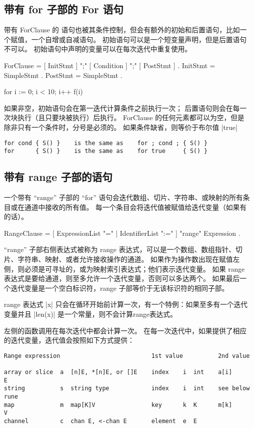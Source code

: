 \subsection{带有 for 子部的 For 语句}
带有 ForClause 的  语句也被其条件控制，但会有额外的初始和后置语句，比如一个赋值，一个自增或自减语句。
初始语句可以是一个短变量声明，但是后置语句不可以。
初始语句中声明的变量可以在每次迭代中重复使用。
\begin{EBNF}
ForClause = [ InitStmt ] ";" [ Condition ] ";" [ PostStmt ] .
InitStmt = SimpleStmt .
PostStmt = SimpleStmt .
\end{EBNF}




\begin{golang}
for i := 0; i < 10; i++ {
	f(i)
}
\end{golang}

如果非空，初始语句会在第一迭代计算条件之前执行一次；
后置语句则会在每一次块执行（且只要块被执行）后执行。
ForClause 的任何元素都可以为空，但是除非只有一个条件时，分号是必须的。
如果条件缺省，则等价于布尔值 \code|true|
\begin{lstlisting}
for cond { S() }    is the same as    for ; cond ; { S() }
for      { S() }    is the same as    for true     { S() }
\end{lstlisting}

\subsection{带有 range 子部的语句}
一个带有 ``range'' 子部的 ``for'' 语句会迭代数组、切片、字符串、或映射的所有条目或在通道中接收的所有值。
每一个条目会将迭代值被赋值给迭代变量（如果有的话）。
\begin{EBNF}
RangeClause = [ ExpressionList "=" | IdentifierList ":=" ] "range" Expression .
\end{EBNF}

``range'' 子部右侧表达式被称为 range 表达式，可以是一个数组、数组指针、切片、字符串、映射、或者允许接收操作的通道。
如果作为操作数出现在赋值左侧，则必须是可寻址的，或为映射索引表达式；他们表示迭代变量。
如果 range 表达式是要给通道，则至多允许一个迭代变量，否则可以多达两个。
如果最后一个迭代变量是一个空白标识符，range 子部等价于无该标识符的相同子部。

range 表达式 \code|x| 只会在循环开始前计算一次，有一个特例：如果至多有一个迭代变量并且 \code|len(x)| 是一个常量，则不会计算range表达式。

左侧的函数调用在每次迭代中都会计算一次。
在每一次迭代中，如果提供了相应的迭代变量，迭代值会按照如下方式提供：
\begin{lstlisting}
Range expression                          1st value          2nd value

array or slice  a  [n]E, *[n]E, or []E    index    i  int    a[i]       E
string          s  string type            index    i  int    see below  rune
map             m  map[K]V                key      k  K      m[k]       V
channel         c  chan E, <-chan E       element  e  E
\end{lstlisting}


